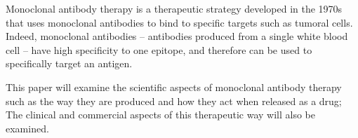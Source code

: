 Monoclonal antibody therapy is a therapeutic strategy developed in the 1970s
that uses monoclonal antibodies to bind to specific targets such as tumoral cells.
Indeed, monoclonal antibodies -- antibodies produced from a single white blood cell --
have high specificity to one epitope, and therefore can be used to specifically target
an antigen.

This paper will examine the scientific aspects of monoclonal antibody therapy
such as the way they are produced and how they act when released as a drug;
The clinical and commercial aspects of this therapeutic way will also be examined.

